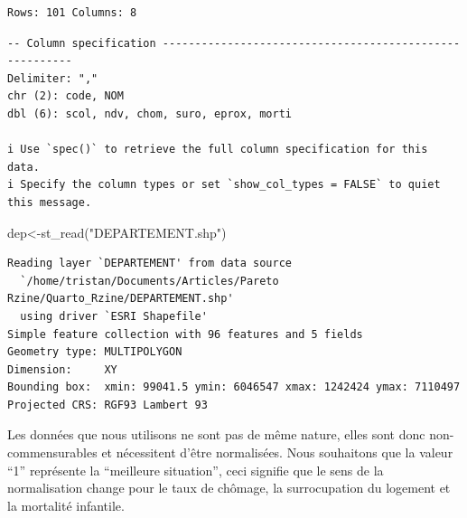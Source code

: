 \documentclass[
  french,
  11pt,
  a4paper,
]{article}
\newenvironment{Shaded}{}{}
\newcommand{\FunctionTok}[1]{\textcolor[rgb]{0.44,0.26,0.76}{#1}}
\newcommand{\NormalTok}[1]{\textcolor[rgb]{0.14,0.16,0.18}{#1}}
\newcommand{\OtherTok}[1]{\textcolor[rgb]{0.44,0.26,0.76}{#1}}
\newcommand{\StringTok}[1]{\textcolor[rgb]{0.01,0.18,0.38}{#1}}
\begin{document}
\begin{verbatim}
Rows: 101 Columns: 8
\end{verbatim}

\begin{verbatim}
-- Column specification --------------------------------------------------------
Delimiter: ","
chr (2): code, NOM
dbl (6): scol, ndv, chom, suro, eprox, morti

i Use `spec()` to retrieve the full column specification for this data.
i Specify the column types or set `show_col_types = FALSE` to quiet this message.
\end{verbatim}

\begin{Shaded}
\begin{Highlighting}[]
\NormalTok{dep}\OtherTok{\textless{}{-}}\FunctionTok{st\_read}\NormalTok{(}\StringTok{"DEPARTEMENT.shp"}\NormalTok{)}
\end{Highlighting}
\end{Shaded}

\begin{verbatim}
Reading layer `DEPARTEMENT' from data source 
  `/home/tristan/Documents/Articles/Pareto Rzine/Quarto_Rzine/DEPARTEMENT.shp' 
  using driver `ESRI Shapefile'
Simple feature collection with 96 features and 5 fields
Geometry type: MULTIPOLYGON
Dimension:     XY
Bounding box:  xmin: 99041.5 ymin: 6046547 xmax: 1242424 ymax: 7110497
Projected CRS: RGF93 Lambert 93
\end{verbatim}

Les données que nous utilisons ne sont pas de même nature, elles sont
donc non-commensurables et nécessitent d'être normalisées. Nous
souhaitons que la valeur ``1'' représente la ``meilleure situation'',
ceci signifie que le sens de la normalisation change pour le taux de
chômage, la surrocupation du logement et la mortalité infantile.
\end{document}
